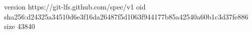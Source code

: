 version https://git-lfs.github.com/spec/v1
oid sha256:d24325a34510d6e3f16da26487f5d1063f944177b85a42540a60b1c3d37fe886
size 43840
